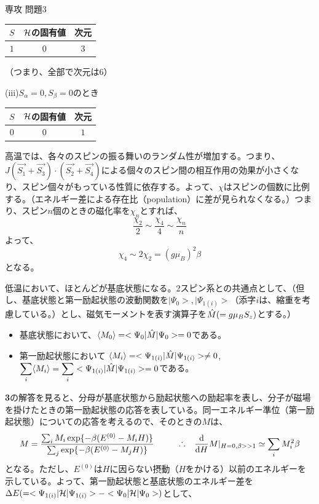 \documentclass[fleqn]{jbook}
\begin{document}
\begin{answer}{専攻 問題3}{}
\begin{subanswers}
{\begin{tabular}{|c|c|c|}\hline
$S$ & $\cal{H}$の固有値 & 次元 \\ \hline \hline 
$1$ & $0$                 & $ 3 $ \\ \hline
\end{tabular}

（つまり、全部で次元は$6$）
}
\parbox[t]{50mm}{
(iii)$S_\alpha=0,S_\beta=0$のとき 

\begin{tabular}{|c|c|c|}\hline
$S$ & $\cal{H}$の固有値 & 次元 \\ \hline \hline
$0$ & $0$              & $ 1 $ \\ \hline
\end{tabular} }

\SubAnswer
高温では、各々のスピンの振る舞いのランダム性が増加する。つまり、$J(\vec{S_1}+\vec{S_3})\cdot (\vec{S_2}+\vec{S_4})$による個々のスピン間の相互作用の効果が小さくなり、スピン個々がもっている性質に依存する。よって、$\chi$はスピンの個数に比例する。（エネルギー差による存在比（population）に差が見られなくなる。）つまり、スピン$n$個のときの磁化率を$\chi_n$とすれば、
\[ \frac{\chi_2}{2} \sim \frac{\chi_4}{4} \sim \frac{\chi_n}{n} \]
よって、
\[ \chi_4 \sim 2 \chi_2 = (g\mu_B)^2 \beta \]
となる。

低温において、ほとんどが基底状態になる。2スピン系との共通点として、（但し、基底状態と第一励起状態の波動関数を$|\Psi_0>,|\Psi_{1(i)}>$（添字$i$は、縮重を考慮している。）とし、磁気モーメントを表す演算子を$\hat{M}(=g\mu_B S_z)$とする。）
\begin{itemize}
\item 基底状態において、${\displaystyle{\langle{M_0}\rangle=<\Psi_0| \hat{M} | \Psi_0>=0}}$である。
\item 第一励起状態において ${\displaystyle{\langle{M_i}\rangle=<\Psi_{1(i)}|\hat{M} | \Psi_{1(i)}> \neq 0}}$\quad , \quad ${\displaystyle{\sum_{i}\langle{M_i}\rangle= \sum_{i}<\Psi_{1(i)}|\hat{M} | \Psi_{1(i)}> =0}}$である。
\end{itemize}
{\bf{3}}の解答を見ると、分母が基底状態から励起状態への励起率を表し、分子が磁場を掛けたときの第一励起状態の応答を表している。同一エネルギー準位（第一励起状態）についての応答を考えるので、そのときの$M$は、
\[ M=\frac{\sum_i M_i \exp\{-\beta(E^{(0)}-M_i H)\}}{\sum_j \exp\{-\beta (E^{(0)}-M_j H)\}} \hspace{10mm} \Yueni \Deriver{}{H} M|_{H=0,\beta>>1}\simeq \sum_i M_i^2 \beta \]
となる。ただし、$E^{(0)}$は$H$に因らない摂動（$H$をかける）以前のエネルギーを示している。よって、第一励起状態と基底状態のエネルギー差を$\Delta E (= <\Psi_{1(i)}|{\cal{H}}|\Psi_{1(i)}>-<\Psi_0|{\cal{H}}|\Psi_0>)$として、


\end{subanswers}
\end{answer}
\end{document}

